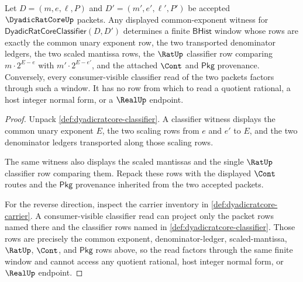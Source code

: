 \begin{theorem}
\label{thm:dyadicratcore-common-exponent-window-exactness}
Let $D=(m,e,\ell,P)$ and $D'=(m',e',\ell',P')$ be accepted
$\DyadicRatCoreUp$ packets. Any displayed common-exponent witness for
$\mathsf{DyadicRatCoreClassifier}(D,D')$ determines a finite
$\mathsf{BHist}$ window whose rows are exactly the common unary exponent row,
the two transported denominator ledgers, the two scaled mantissa rows, the
$\RatUp$ classifier row comparing $m\cdot 2^{E-e}$ with
$m'\cdot 2^{E-e'}$, and the attached $\Cont$ and $\mathsf{Pkg}$ provenance.
Conversely, every consumer-visible classifier read of the two packets factors
through such a window. It has no row from which to read a quotient rational, a
host integer normal form, or a $\RealUp$ endpoint.
\end{theorem}
\begin{proof}
Unpack \autoref{def:dyadicratcore-classifier}. A classifier witness displays
the common unary exponent $E$, the two scaling rows from $e$ and $e'$ to $E$,
and the two denominator ledgers transported along those scaling rows.

The same witness also displays the scaled mantissas and the single $\RatUp$
classifier row comparing them. Repack these rows with the displayed $\Cont$
routes and the $\mathsf{Pkg}$ provenance inherited from the two accepted
packets.

For the reverse direction, inspect the carrier inventory in
\autoref{def:dyadicratcore-carrier}. A consumer-visible classifier read can
project only the packet rows named there and the classifier rows named in
\autoref{def:dyadicratcore-classifier}. Those rows are precisely the common
exponent, denominator-ledger, scaled-mantissa, $\RatUp$, $\Cont$, and
$\mathsf{Pkg}$ rows above, so the read factors through the same finite window
and cannot access any quotient rational, host integer normal form, or
$\RealUp$ endpoint.
\end{proof}

